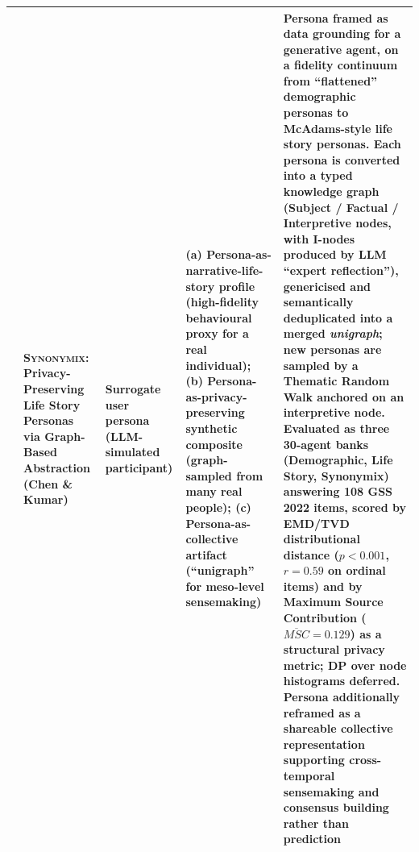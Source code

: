 \begin{table}[t]
\begin{tabular}{p{0.5cm} p{3.6cm} p{3.4cm} p{3.6cm} p{3.6cm}}
\addlinespace
7 & \textsc{Synonymix}: Privacy-Preserving Life Story Personas via Graph-Based Abstraction (Chen \& Kumar) &
Surrogate user persona (LLM-simulated participant) &
(a) Persona-as-narrative-life-story profile (high-fidelity behavioural proxy for a real individual); (b) Persona-as-privacy-preserving synthetic composite (graph-sampled from many real people); (c) Persona-as-collective artifact (``unigraph'' for meso-level sensemaking) &
Persona framed as data grounding for a generative agent, on a fidelity continuum from ``flattened'' demographic personas to McAdams-style life story personas. Each persona is converted into a typed knowledge graph (Subject / Factual / Interpretive nodes, with I-nodes produced by LLM ``expert reflection''), genericised and semantically deduplicated into a merged \emph{unigraph}; new personas are sampled by a Thematic Random Walk anchored on an interpretive node. Evaluated as three 30-agent banks (Demographic, Life Story, Synonymix) answering 108 GSS 2022 items, scored by EMD/TVD distributional distance ($p<0.001$, $r=0.59$ on ordinal items) and by Maximum Source Contribution ($\overline{MSC}=0.129$) as a structural privacy metric; DP over node histograms deferred. Persona additionally reframed as a shareable collective representation supporting cross-temporal sensemaking and consensus building rather than prediction \\
\bottomrule
\end{tabular}
\end{table}
